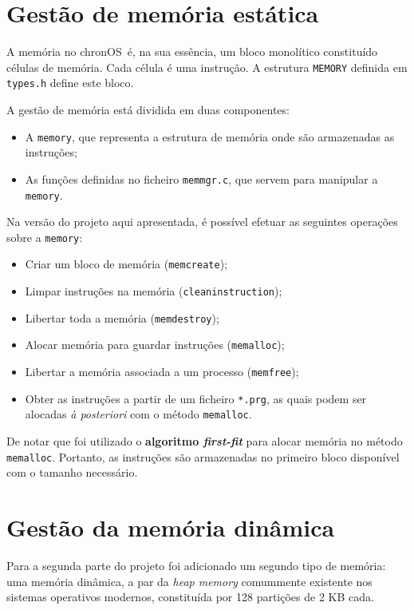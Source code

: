 \documentclass[10pt,oneside]{estiloUBI}
\newcommand{\chronOS}{\textsf{chronOS}}
\begin{document}
	
	\chapter{Gestão de memória estática}
	\label{sec:memory}
	
	A memória no \chronOS~é, na sua essência, um bloco monolítico constituído células de memória. Cada célula é uma instrução. A estrutura \verb|MEMORY| definida em \texttt{types.h} define este bloco.
	
	A gestão de memória está dividida em duas componentes:
	\begin{itemize}
		\item A \verb|memory|, que representa a estrutura de memória onde são armazenadas as instruções;
		\item As funções definidas no ficheiro \verb|memmgr.c|, que servem para manipular a \verb|memory|.
	\end{itemize}
	
	Na versão do projeto aqui apresentada, é possível efetuar as seguintes operações sobre a \verb|memory|:
	\begin{itemize}
		\item Criar um bloco de memória (\verb|memcreate|);
		\item Limpar instruções na memória (\verb|cleaninstruction|);
		\item Libertar toda a memória (\verb|memdestroy|);
		\item Alocar memória para guardar instruções (\verb|memalloc|);
		\item Libertar a memória associada a um processo (\verb|memfree|);
		\item Obter as instruções a partir de um ficheiro \verb|*.prg|, as quais podem ser alocadas \textit{à posteriori} com o método \verb|memalloc|.
	\end{itemize}
	
	De notar que foi utilizado o \textbf{algoritmo \textit{first-fit}} para alocar memória no método \verb|memalloc|. Portanto, as instruções são armazenadas no primeiro bloco disponível com o tamanho necessário.
	
	
	\chapter{Gestão da memória dinâmica}
	\label{sec:heap}
	
	Para a segunda parte do projeto foi adicionado um segundo tipo de memória: uma memória dinâmica, a par da \textit{heap memory} comummente existente nos sistemas operativos modernos, constituída por 128 partições de 2 KB cada.
	
\end{document}
